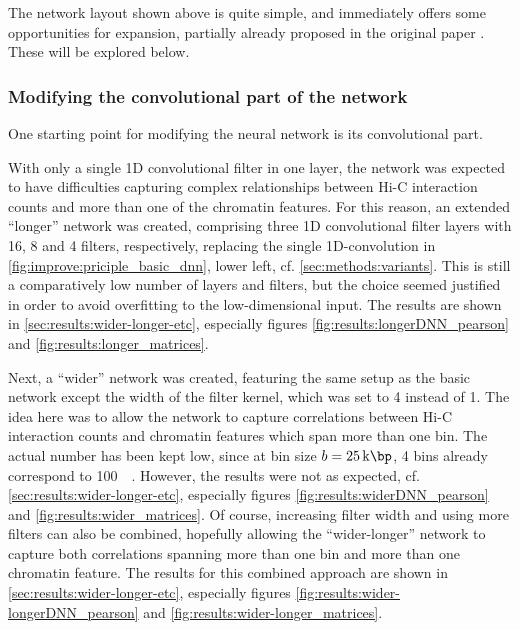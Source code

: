 The network layout shown above is quite simple, and immediately offers some opportunities
for expansion, partially already proposed in the original paper \cite{Farre2018a}.
These will be explored below.

\subsubsection{Modifying the convolutional part of the network} \label{sec:improve:convolution_extensions}
One starting point for modifying the neural network is its convolutional part.

With only a single 1D convolutional filter in one layer, the network was expected to have difficulties capturing complex relationships 
between Hi-C interaction counts and more than one of the chromatin features.
For this reason, an extended ``longer'' network was created, 
comprising three 1D convolutional filter layers with 16, 8 and 4 filters, respectively, replacing the single
1D-convolution in \cref{fig:improve:priciple_basic_dnn}, lower left, cf. \cref{sec:methods:variants}.
This is still a comparatively low number of layers and filters,
but the choice seemed justified in order to avoid overfitting to the low-dimensional input.
The results are shown in \cref{sec:results:wider-longer-etc}, especially figures \ref{fig:results:longerDNN_pearson} and \ref{fig:results:longer_matrices}.

Next, a ``wider'' network was created, featuring the same setup as the basic network
except the width of the filter kernel, which was set to 4 instead of 1.
The idea here was to allow the network to capture correlations between Hi-C interaction counts
and chromatin features which span more than one bin. 
The actual number has been kept low, since at bin size $b=\SI{25}{\kilo\bp}$, 4 bins already correspond to \SI{100}{\kilo\bp}.
However, the results were not as expected, cf. \cref{sec:results:wider-longer-etc}, especially figures \ref{fig:results:widerDNN_pearson} and \ref{fig:results:wider_matrices}.
Of course, increasing filter width and using more filters can also be combined,
hopefully allowing the  ``wider-longer'' network to capture both correlations
spanning more than one bin and more than one chromatin feature.
The results for this combined approach are shown in \cref{sec:results:wider-longer-etc}, especially figures \ref{fig:results:wider-longerDNN_pearson} and \ref{fig:results:wider-longer_matrices}.

